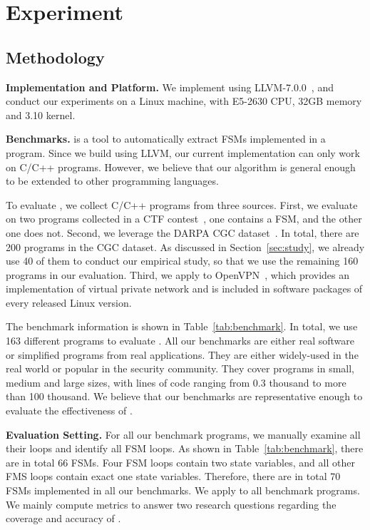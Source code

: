\section{Experiment}

\subsection{Methodology}

\noindent\textbf{Implementation and Platform.} 
We implement \Tool{} using LLVM-7.0.0~\cite{LLVM}, 
and conduct our experiments on a Linux machine, 
with E5-2630 CPU, 32GB memory and 3.10 kernel. 

\noindent\textbf{Benchmarks.}
\Tool{} is a tool to automatically extract FSMs implemented in a program. 
Since we build \Tool{} using LLVM, 
our current implementation can only work on C/C++ programs.  
However, we believe that our algorithm is general enough 
to be extended to other programming languages. 


To evaluate \Tool{}, we collect C/C++ programs from three sources. 
First, we evaluate \Tool{} on two programs collected in a CTF contest~\cite{ctf}, 
one contains a FSM, and the other one does not. 
Second, we leverage the DARPA CGC dataset~\cite{CGC}. 
In total, there are 200 programs in the CGC dataset.
As discussed in Section~\ref{sec:study}, 
we already use 40 of them to conduct our empirical study,
so that we use the remaining 160 programs in our evaluation.
Third, we apply \Tool{} to OpenVPN~\cite{openvpn}, 
which provides an implementation of virtual private network and 
is included in software packages of every released Linux version. 



The benchmark information is shown in Table~\ref{tab:benchmark}.
In total, we use 163 different programs to evaluate \Tool{}.
All our benchmarks are either real software or 
simplified programs from real applications. 
They are either widely-used in the real world or popular in the security community. 
They cover programs in small, medium and large sizes, 
with lines of code ranging from 0.3 thousand to more than 100 thousand.  
We believe that our benchmarks are representative 
enough to evaluate the effectiveness of \Tool{}.

\noindent\textbf{Evaluation Setting.} 
For all our benchmark programs, we manually examine all their loops and 
identify all FSM loops. 
As shown in Table~\ref{tab:benchmark}, there are in 
total 66 FSMs.
Four FSM loops contain two state variables, 
and all other FMS loops contain exact one state variables.
Therefore, there are in total 70 FSMs implemented in all our benchmarks.  
We apply \Tool{} to all benchmark programs. 
We mainly compute metrics to answer two research 
questions regarding the coverage and accuracy of \Tool{}.

